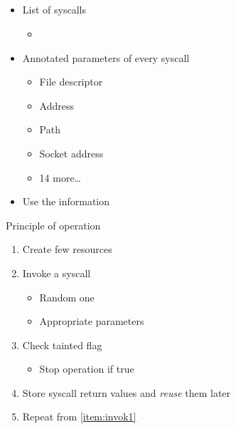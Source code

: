 \subsection{\trin}
\frame{\subsectionpage}

\begin{frame}{\trin}

  \begin{itemize}
    \item List of syscalls
    \begin{itemize}
      \item {}
    \end{itemize}

    \pause

    \item Annotated parameters of every syscall
    \begin{itemize}
      \item File descriptor
      \item Address
      \item Path
      \item Socket address
      \item 14 more\dots
    \end{itemize}

    \pause

    \item Use the information
  \end{itemize}

\end{frame}

\begin{frame}{\trin}{Principle of operation}

  \begin{enumerate}
    \item Create few resources

    \pause

    \item \label{item:invok1} Invoke a syscall
    \begin{itemize}
      \item Random one
      \item Appropriate parameters
    \end{itemize}

    \pause

    \item Check tainted flag
    \begin{itemize}
      \item Stop operation if true
    \end{itemize}

    \pause

    \item Store syscall return values and \emph{reuse} them later

    \pause

    \item Repeat from \ref{item:invok1}
  \end{enumerate}

\end{frame}

